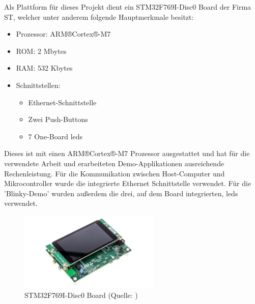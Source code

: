 \documentclass[../EDF Master Thesis.tex]{subfiles}
\begin{document}
Als Plattform für dieses Projekt dient ein STM32F769I-Disc0 Board der Firma ST, welcher unter anderem folgende Hauptmerkmale besitzt:

\begin{itemize}
    \item Prozessor: ARM®Cortex®-M7
    \item ROM: 2 Mbytes
    \item RAM: 532 Kbytes
    \item Schnittstellen:
    \begin{itemize}
        \item Ethernet-Schnittstelle
        \item Zwei Push-Buttons
        \item 7 One-Board \ac{led}s
    \end{itemize}
\end{itemize}


Dieses ist mit einen ARM®Cortex®-M7 Prozessor ausgestattet und hat für die verwendete Arbeit und erarbeiteten Demo-Applikationen ausreichende Rechenleistung.
Für die Kommunikation zwischen Host-Computer und Mikrocontroller wurde die integrierte Ethernet Schnittstelle verwendet.
Für die 'Blinky-Demo' wurden außerdem die drei, auf dem Board integrierten, \ac{led}s verwendet.

\begin{figure}[ht!]
    \begin{center}
        \includegraphics[width=0.6\textwidth]{attachments/stm32f769i-disc0.pdf}
    \end{center}
    \caption[STM32F769I-Disc0 Board]{STM32F769I-Disc0 Board (Quelle: \cite{stm:001})}
    \label{fig:STM32F769I-Disc0_board}
\end{figure}
\end{document}

